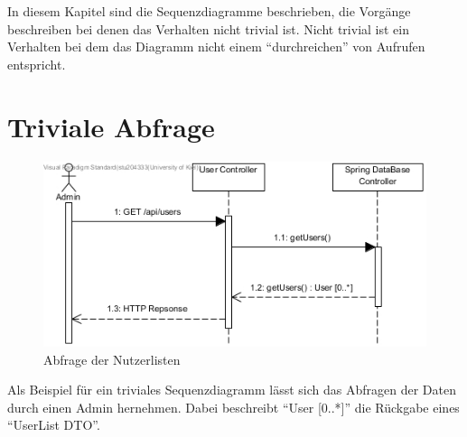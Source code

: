 
In diesem Kapitel sind die Sequenzdiagramme beschrieben, die Vorgänge beschreiben bei denen das Verhalten nicht trivial ist.
Nicht trivial ist ein Verhalten bei dem das Diagramm nicht einem ``durchreichen'' von Aufrufen entspricht.
\section{Triviale Abfrage}
\begin{figure}[H]
	\centering
	\includegraphics[width = 12cm]{img/diagrams/TrivialDiagram}
	\caption{Abfrage der Nutzerlisten}
\end{figure}
Als Beispiel für ein triviales Sequenzdiagramm lässt sich das Abfragen der Daten durch einen Admin hernehmen. Dabei beschreibt ``User [0..*]'' die Rückgabe eines ``UserList DTO''.
 
